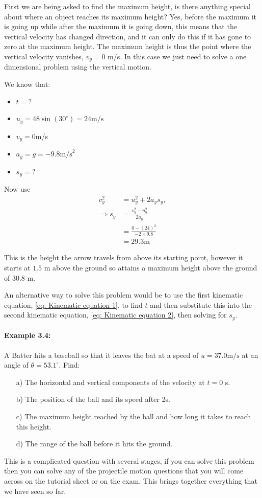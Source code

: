 \documentclass[a4paper,12pt]{book}
\begin{document}
First we are being asked to find the maximum height, is there anything special about where an object reaches its maximum height? Yes, before the maximum it is going up while after the maximum it is going down, this means that the vertical velocity has changed direction, and it can only do this if it has gone to zero at the maximum height. The maximum height is thus the point where the vertical velocity vanishes, $v_{y}=0$ m/s. In this case we just need to solve a one dimensional problem using the vertical motion. 

We know that:
\begin{itemize}
\setlength{\itemsep}{-5pt}
    \item $t=?$
\item $u_{y}=48\sin\left(30^{\circ}\right)=24\text{m/s}$
\item $v_{y}=0$m/s
\item $a_{y}=g=-9.8\text{m/s}^{2}$
\item $s_{y}=?$
\end{itemize}

Now use
\begin{align*}
v_{y}^{2}&=u_{y}^{2}+2a_{y}s_{y},\\
\Rightarrow s_{y}&=\frac{v_{y}^{2}-u_{y}^{2}}{2a_{y}}\\
&=\frac{0-(24)^{2}}{-2\times 9.8}\\
&=29.3\text{m}
\end{align*}

This is the height the arrow travels from above its starting point, however it starts at $1.5$ m above the ground so attains a maximum height above the ground of $30.8$ m. 

An alternative way to solve this problem would be to use the first kinematic equation, \cref{eq: Kinematic equation 1}, to find $t$ and then substitute this into the second kinematic equation, \cref{eq: Kinematic equation 2}, then solving for $s_{y}$.\\



\paragraph{Example 3.4:} A Batter hits a baseball so that it leaves the bat at a speed of $u=37.0\text{m/s}$ at an angle of $\theta=53.1^{\circ}$. Find:
\begin{itemize}
\setlength{\itemsep}{-5pt}
    \item[a)] The horizontal and vertical components of the velocity at $t=0$ s.
    \item[b)] The position of the ball and its speed after 2s.
    \item[c)] The maximum height reached by the ball and how long it takes to reach this height.
    \item[d)] The range of the ball before it hits the ground.
\end{itemize}
This is a complicated question with several stages, if you can solve this problem then you can solve any of the projectile motion questions that you will come across on the tutorial sheet or on the exam. This brings together everything that we have seen so far.
\end{document}
